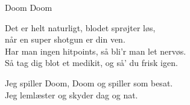 \begin{song}{Doom Doom}
  \begin{SBSection*}
    Det er helt naturligt, blodet sprøjter løs,\\
    når en super shotgun er din ven.\\
    Har man ingen hitpoints, så bli'r man let nervøs.\\
    Så tag dig blot et medikit, og så' du frisk igen.
  \end{SBSection*}

  \begin{SBChorus}
  \end{SBChorus}

  \begin{SBChorus}
    Jeg spiller Doom, Doom og spiller som besat.\\
    Jeg lemlæster og skyder dag og nat.
  \end{SBChorus}
\end{song}